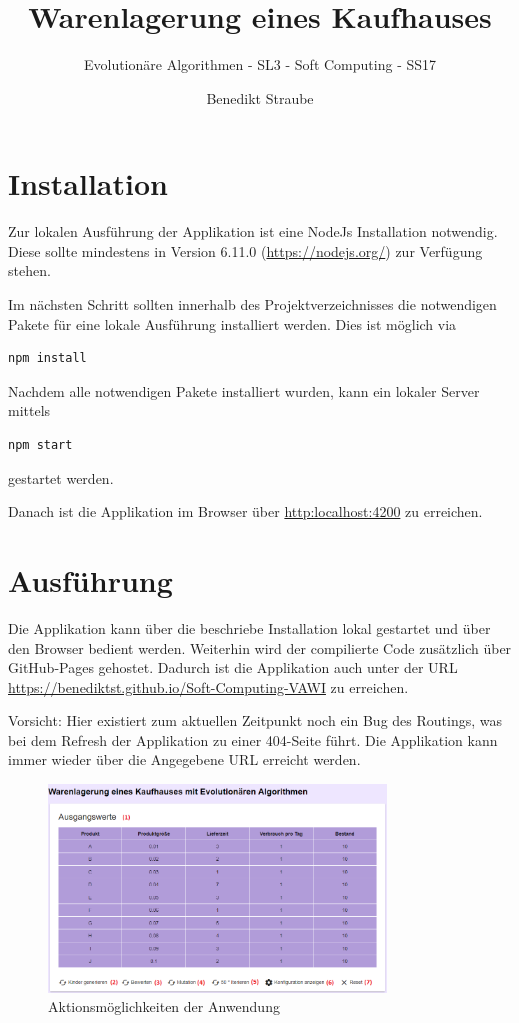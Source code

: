 \documentclass[]{scrartcl}
\title{Warenlagerung eines Kaufhauses}
\subtitle{Evolutionäre Algorithmen - SL3 - Soft Computing - SS17}
\author{Benedikt Straube}
\begin{document}
\maketitle

\newpage

\section{Installation}
Zur lokalen Ausführung der Applikation ist eine NodeJs Installation notwendig. Diese sollte mindestens in Version 6.11.0 (\url{https://nodejs.org/}) zur Verfügung stehen.

Im nächsten Schritt sollten innerhalb des Projektverzeichnisses die notwendigen Pakete für eine lokale Ausführung installiert werden. Dies ist möglich via 
\begin{lstlisting}[backgroundcolor=\color{lightgray}]
npm install
\end{lstlisting}

Nachdem alle notwendigen Pakete installiert wurden, kann ein lokaler Server mittels
\begin{lstlisting}[backgroundcolor=\color{lightgray}]
npm start
\end{lstlisting}
gestartet werden.

Danach ist die Applikation im Browser über \url{http:localhost:4200} zu erreichen.

\newpage
\section{Ausführung}
\label{ausfuehrung}
Die Applikation kann über die beschriebe Installation lokal gestartet und über den Browser bedient werden. Weiterhin wird der compilierte Code zusätzlich über GitHub-Pages gehostet. Dadurch ist die Applikation auch unter der URL \url{https://benediktst.github.io/Soft-Computing-VAWI} zu erreichen.

Vorsicht: Hier existiert zum aktuellen Zeitpunkt noch ein Bug des Routings, was bei dem Refresh der Applikation zu einer 404-Seite führt. Die Applikation kann immer wieder über die Angegebene URL erreicht werden.

\begin{figure}[htbp]
	\centering
	\includegraphics[width=0.8\textwidth]{res/interface.png}
	\caption{Aktionsmöglichkeiten der Anwendung}
	\label{img:interface}
\end{figure}
\end{document}
